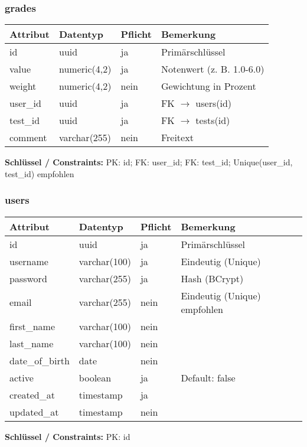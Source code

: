 \documentclass[12pt,a4paper]{article}
\begin{document}
    \subsubsection{grades}
    \begin{longtable}{|L{4cm}|L{3cm}|L{3cm}|L{4cm}|}
        \hline
        \textbf{Attribut} & \textbf{Datentyp} & \textbf{Pflicht} & \textbf{Bemerkung} \\ \hline
        id & uuid & ja & Primärschlüssel \\ \hline
        value & numeric(4,2) & ja & Notenwert (z. B. 1.0-6.0) \\ \hline
        weight & numeric(4,2) & nein & Gewichtung in Prozent \\ \hline
        user\_id & uuid & ja & FK $\rightarrow$ users(id) \\ \hline
        test\_id & uuid & ja & FK $\rightarrow$ tests(id) \\ \hline
        comment & varchar(255) & nein & Freitext \\ \hline
    \end{longtable}
    \textbf{Schlüssel / Constraints:} PK: id; FK: user\_id; FK: test\_id; Unique(user\_id, test\_id) empfohlen

    \subsubsection{users}
    \begin{longtable}{|L{4cm}|L{3cm}|L{3cm}|L{4cm}|}
        \hline
        \textbf{Attribut} & \textbf{Datentyp} & \textbf{Pflicht} & \textbf{Bemerkung} \\ \hline
        id & uuid & ja & Primärschlüssel \\ \hline
        username & varchar(100) & ja & Eindeutig (Unique) \\ \hline
        password & varchar(255) & ja & Hash (BCrypt) \\ \hline
        email & varchar(255) & nein & Eindeutig (Unique) empfohlen \\ \hline
        first\_name & varchar(100) & nein &  \\ \hline
        last\_name & varchar(100) & nein &  \\ \hline
        date\_of\_birth & date & nein &  \\ \hline
        active & boolean & ja & Default: false \\ \hline
        created\_at & timestamp & ja &  \\ \hline
        updated\_at & timestamp & nein &  \\ \hline
    \end{longtable}
    \textbf{Schlüssel / Constraints:} PK: id
\end{document}
